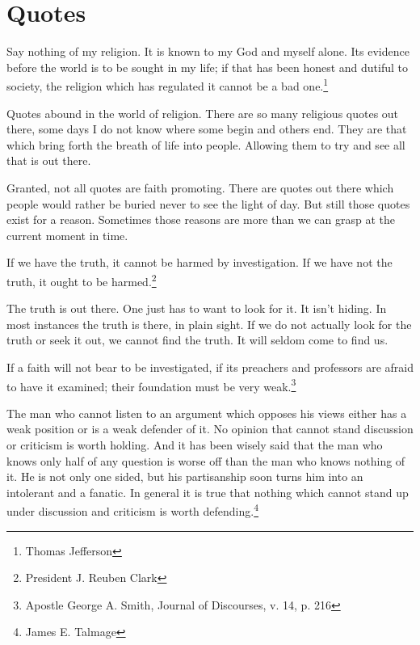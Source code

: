 \chapter{Quotes}

\begin{displayquote}
Say nothing of my religion. It is known to my God and myself alone. Its evidence 
before the world is to be sought in my life; if that has been honest and dutiful 
to society, the religion which has regulated it cannot be a bad one.\footnote{
Thomas Jefferson
}
\end{displayquote}

Quotes abound in the world of religion. There are so many religious quotes out 
there, some days I do not know where some begin and others end. They are that 
which bring forth the breath of life into people. Allowing them to try and see 
all that is out there.

Granted, not all quotes are faith promoting. There are quotes out there which 
people would rather be buried never to see the light of day. But still those 
quotes exist for a reason. Sometimes those reasons are more than we can grasp 
at the current moment in time.

\begin{displayquote}
If we have the truth, it cannot be harmed by investigation. 
If we have not the truth, it ought to be harmed.\footnote{
President J. Reuben Clark}
\end{displayquote}

The truth is out there. One just has to want to look for it. It isn't hiding. 
In most instances the truth is there, in plain sight. If we do not actually 
look for the truth or seek it out, we cannot find the truth. It will seldom 
come to find us.

\begin{displayquote}
If a faith will not bear to be investigated, if its preachers and professors are 
afraid to have it examined; their foundation must be very weak.\footnote{Apostle 
George A. Smith, Journal of Discourses, v. 14, p. 216}
\end{displayquote}

\begin{displayquote}
The man who cannot listen to an argument which opposes his views either has a 
weak position or is a weak defender of it. No opinion that cannot stand 
discussion or criticism is worth holding. And it has been wisely said that 
the man who knows only half of any question is worse off than the man who 
knows nothing of it. He is not only one sided, but his partisanship soon 
turns him into an intolerant and a fanatic. In general it is true that nothing 
which cannot stand up under discussion and criticism is worth
defending.\footnote{James E. Talmage}
\end{displayquote}

